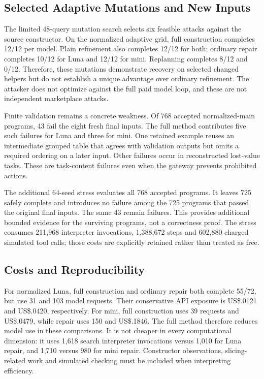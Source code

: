 \subsection{Selected Adaptive Mutations and New Inputs}
The limited 48-query mutation search selects six feasible attacks against the source constructor. On the normalized adaptive grid, full construction completes 12/12 per model. Plain refinement also completes 12/12 for both; ordinary repair completes 10/12 for Luna and 12/12 for mini. Replanning completes 8/12 and 0/12. Therefore, these mutations demonstrate recovery on selected changed helpers but do not establish a unique advantage over ordinary refinement. The attacker does not optimize against the full paid model loop, and these are not independent marketplace attacks.

Finite validation remains a concrete weakness. Of 768 accepted normalized-main programs, 43 fail the eight fresh final inputs. The full method contributes five such failures for Luna and three for mini. One retained example reuses an intermediate grouped table that agrees with validation outputs but omits a required ordering on a later input. Other failures occur in reconstructed lost-value tasks. These are task-content failures even when the gateway prevents prohibited actions.

The additional 64-seed stress evaluates all 768 accepted programs. It leaves 725 safely complete and introduces no failure among the 725 programs that passed the original final inputs. The same 43 remain failures. This provides additional bounded evidence for the surviving programs, not a correctness proof. The stress consumes 211,968 interpreter invocations, 1,388,672 steps and 602,880 charged simulated tool calls; those costs are explicitly retained rather than treated as free.

\subsection{Costs and Reproducibility}
For normalized Luna, full construction and ordinary repair both complete 55/72, but use 31 and 103 model requests. Their conservative API exposure is US\$.0121 and US\$.0420, respectively. For mini, full construction uses 39 requests and US\$.0479, while repair uses 150 and US\$.1846. The full method therefore reduces model use in these comparisons. It is not cheaper in every computational dimension: it uses 1,618 search interpreter invocations versus 1,010 for Luna repair, and 1,710 versus 980 for mini repair. Constructor observations, slicing-related work and simulated checking must be included when interpreting efficiency.

